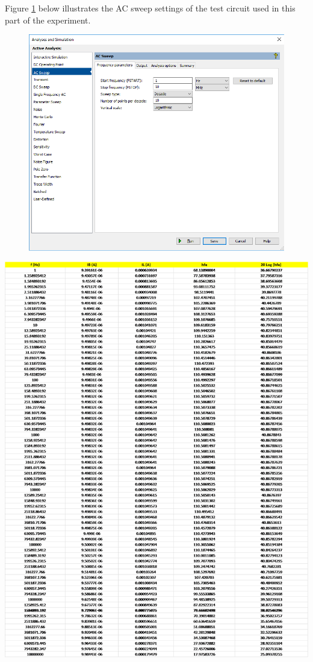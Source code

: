 \documentclass{article}
\begin{document}
	\noindent Figure \ref{f31} below illustrates the AC sweep settings of the test circuit used in this part of the experiment.
	\begin{figure}[!ht]
		\centering
		\includegraphics[width=0.7\linewidth]{part4-e-simSettings-0.5ma.png}
		\label{f31}
	\end{figure}
	
	\pagebreak
	
	\begin{table}[!ht]
		\centering
		\label{t11}
		\includegraphics[width=\linewidth]{part4-e-data-0.5ma.png}	
	\end{table}
	
\end{document}
